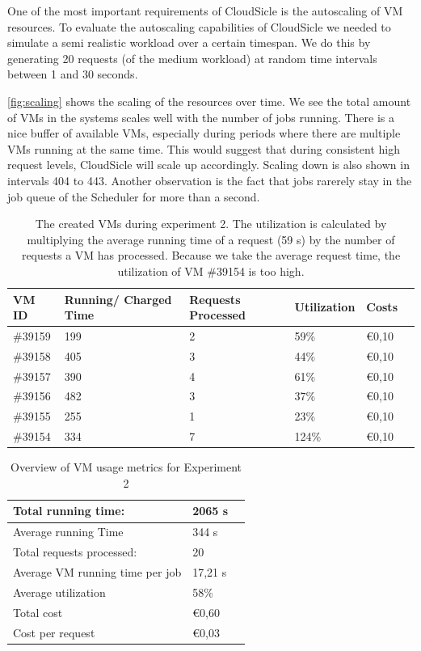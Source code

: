 \documentclass[twocolumn,twoside]{IEEEtran}
\begin{document}
One of the most important requirements of CloudSicle is the autoscaling of VM resources. To evaluate the autoscaling capabilities of CloudSicle we needed to simulate a semi realistic workload over a certain timespan. We do this by generating 20 requests (of the medium workload) at random time intervals between 1 and 30 seconds.

\autoref{fig:scaling} shows the scaling of the resources over time. We see the total amount of VMs in the systems scales well with the number of jobs running. There is a nice buffer of available VMs, especially during periods where there are multiple VMs running at the same time. This would suggest that during consistent high request levels, CloudSicle will scale up accordingly. Scaling down is also shown in intervals 404 to 443. Another observation is the fact that jobs rarerely stay in the job queue of the Scheduler for more than a second.


\begin{table}
\label{tab:exp2vms1}
\caption{The created VMs during experiment 2. The utilization is calculated by multiplying the average running time of a request (59 s)  by the number of requests a VM has processed. Because we take the average request time, the utilization of VM \#39154 is too high.}
\begin{tabularx}{92mm}{|l||X|X|X|X|X|}
\hline 
VM ID & Running/ Charged Time & Requests Processed & Utilization & Costs \\
\hline 
\hline 
\#39159 & 199 & 2 & 59\% & \euro{0,10} \\
\hline 
\#39158 & 405 & 3 & 44\% &  \euro{0,10} \\
\hline 
\#39157 & 390 & 4 & 61\% & \euro{0,10} \\
\hline 
\#39156 & 482 & 3 & 37\% &  \euro{0,10} \\
\hline 
\#39155 & 255 & 1 & 23\%  &  \euro{0,10} \\
\hline 
\#39154 & 334 & 7 & 124\% &  \euro{0,10} \\
\hline 
\end{tabularx}
\end{table}


\begin{table}
\label{tab:exp2vms2}
\caption{Overview of VM usage metrics for Experiment 2}
\begin{tabularx}{92mm}{|l||X|X|}
\hline 
Total running time:	& 2065 s \\
\hline 
Average running Time & 344 s \\
\hline 
Total requests processed: & 20 \\
\hline 
Average VM running time per job & 17,21 s \\
\hline 
Average utilization & 58\% \\
\hline 
Total cost & \euro{0,60} \\
\hline 
Cost per request & \euro{0,03} \\
\hline 
\end{tabularx}
\end{table}
\end{document}
